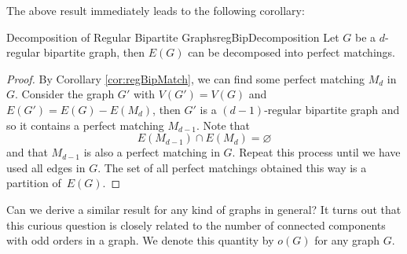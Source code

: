 \documentclass[math]{amznotes}
\theoremstyle{remark}
\newcommand{\0}{\mathbf{0}}
\newcommand{\1}{\mathbf{1}}
\begin{document}
The above result immediately leads to the following corollary:
\begin{corbox}{Decomposition of Regular Bipartite Graphs}{regBipDecomposition}
    Let $G$ be a $d$-regular bipartite graph, then $E(G)$ can be decomposed into perfect matchings.
    \tcblower
    \begin{proof}
        By Corollary \ref{cor:regBipMatch}, we can find some perfect matching $M_d$ in $G$. Consider the graph $G'$ with $V(G') = V(G)$ and $E(G') = E(G) - E(M_d)$, then $G'$ is a $(d - 1)$-regular bipartite graph and so it contains a perfect matching $M_{d - 1}$. Note that
        \begin{equation*}
            E(M_{d - 1}) \cap E(M_d) = \varnothing
        \end{equation*}
        and that $M_{d - 1}$ is also a perfect matching in $G$. Repeat this process until we have used all edges in $G$. The set of all perfect matchings obtained this way is a partition of~$E(G)$.
    \end{proof}
\end{corbox}
Can we derive a similar result for any kind of graphs in general? It turns out that this curious question is closely related to the number of connected components with odd orders in a graph. We denote this quantity by $o(G)$ for any graph $G$.
\end{document}
